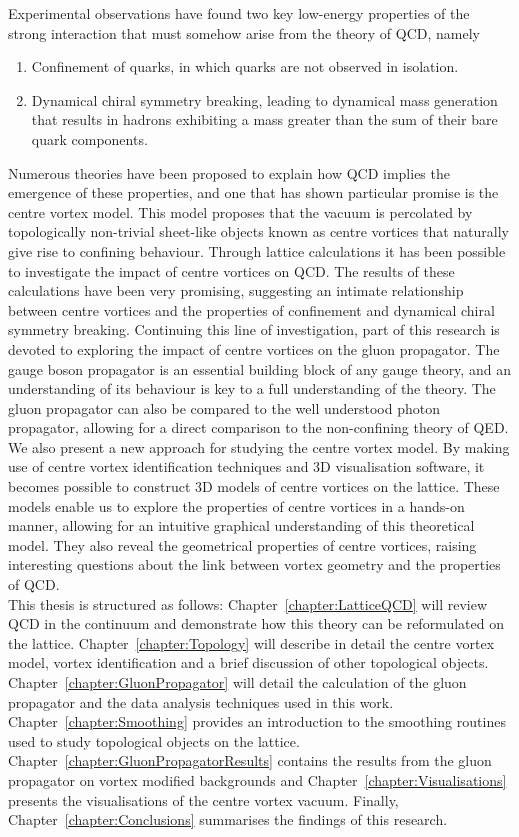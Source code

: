 Experimental observations have found two key low-energy properties of the strong interaction that must somehow arise from the theory of QCD, namely
%
\begin{enumerate}
\item Confinement of quarks, in which quarks are not observed in isolation.
\item Dynamical chiral symmetry breaking, leading to dynamical mass generation that results in hadrons exhibiting a mass greater than the sum of their bare quark components.
\end{enumerate}
%
Numerous theories have been proposed to explain how QCD implies the emergence of these properties, and one that has shown particular promise is the centre vortex model. This model proposes that the vacuum is percolated by topologically non-trivial sheet-like objects known as centre vortices that naturally give rise to confining behaviour. Through lattice calculations it has been possible to investigate the impact of centre vortices on QCD. The results of these calculations have been very promising, suggesting an intimate relationship between centre vortices and the properties of confinement and dynamical chiral symmetry breaking. Continuing this line of investigation, part of this research is devoted to exploring the impact of centre vortices on the gluon propagator. The gauge boson propagator is an essential building block of any gauge theory, and an understanding of its behaviour is key to a full understanding of the theory. The gluon propagator can also be compared to the well understood photon propagator, allowing for a direct comparison to the non-confining theory of QED.\\

We also present a new approach for studying the centre vortex model. By making use of centre vortex identification techniques and 3D visualisation software, it becomes possible to construct 3D models of centre vortices on the lattice. These models enable us to explore the properties of centre vortices in a hands-on manner, allowing for an intuitive graphical understanding of this theoretical model. They also reveal the geometrical properties of centre vortices, raising interesting questions about the link between vortex geometry and the properties of QCD.\\

This thesis is structured as follows: Chapter~\ref{chapter:LatticeQCD} will review QCD in the continuum and demonstrate how this theory can be reformulated on the lattice. Chapter~\ref{chapter:Topology} will describe in detail the centre vortex model, vortex identification and a brief discussion of other topological objects. Chapter~\ref{chapter:GluonPropagator} will detail the calculation of the gluon propagator and the data analysis techniques used in this work. Chapter~\ref{chapter:Smoothing} provides an introduction to the smoothing routines used to study topological objects on the lattice. Chapter~\ref{chapter:GluonPropagatorResults} contains the results from the gluon propagator on vortex modified backgrounds and Chapter~\ref{chapter:Visualisations} presents the visualisations of the centre vortex vacuum. Finally, Chapter~\ref{chapter:Conclusions} summarises the findings of this research.